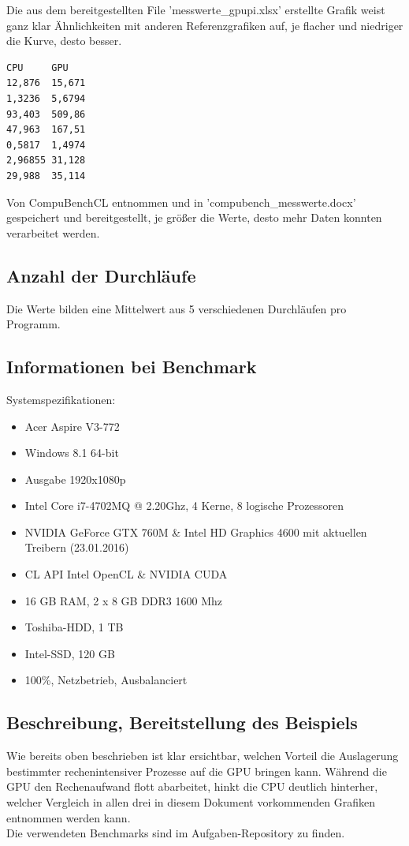 \documentclass[letterpaper, 12pt]{article}
\let\tempsubsection\subsection
\renewcommand\subsection[1]{\vspace{0cm}\tempsubsection{#1}\vspace{0cm}}
\begin{document}
Die aus dem bereitgestellten File 'messwerte\_gpupi.xlsx' erstellte Grafik weist ganz klar Ähnlichkeiten mit anderen Referenzgrafiken auf, je flacher und niedriger die Kurve, desto besser.

\begin{lstlisting}[frame=single,language=bash, caption=Vergleichswerte]
CPU		GPU
12,876	15,671
1,3236	5,6794
93,403	509,86
47,963	167,51
0,5817	1,4974
2,96855	31,128
29,988	35,114
\end{lstlisting}
Von CompuBenchCL entnommen und in 'compubench\_messwerte.docx' gespeichert und bereitgestellt, je größer die Werte, desto mehr Daten konnten verarbeitet werden.
\subsection{Anzahl der Durchläufe}
Die Werte bilden eine Mittelwert aus 5 verschiedenen Durchläufen pro Programm.
\subsection{Informationen bei Benchmark}
Systemspezifikationen:
\begin{itemize}
	\item Acer Aspire V3-772
	\item Windows 8.1 64-bit
	\item Ausgabe 1920x1080p
	\item Intel Core i7-4702MQ @ 2.20Ghz, 4 Kerne, 8 logische Prozessoren
	\item NVIDIA GeForce GTX 760M \& Intel HD Graphics 4600 mit aktuellen Treibern (23.01.2016)
	\item CL API Intel OpenCL \& NVIDIA CUDA
	\item 16 GB RAM, 2 x 8 GB DDR3 1600 Mhz
	\item Toshiba-HDD, 1 TB
	\item Intel-SSD, 120 GB
	\item 100\%, Netzbetrieb, Ausbalanciert
\end{itemize}
\subsection{Beschreibung, Bereitstellung des Beispiels}
Wie bereits oben beschrieben ist klar ersichtbar, welchen Vorteil die Auslagerung bestimmter rechenintensiver Prozesse auf die GPU bringen kann. Während die GPU den Rechenaufwand flott abarbeitet, hinkt die CPU deutlich hinterher, welcher Vergleich in allen drei in diesem Dokument vorkommenden Grafiken entnommen werden kann. \\
Die verwendeten Benchmarks sind im Aufgaben-Repository zu finden. \cite{repo}

\newpage



\lstlistoflistings
\listoffigures
\end{document}
